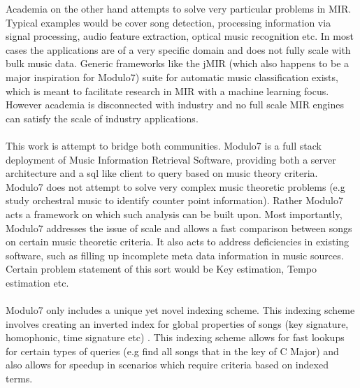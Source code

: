 Academia on the other hand attempts to solve very particular problems in MIR. Typical examples would be cover song detection, processing information via signal processing, audio feature extraction, optical music recognition etc. In most cases the applications are of a very specific domain and does not fully scale with bulk music data. Generic frameworks like the jMIR \cite{jMIR} (which also happens to be a major inspiration for Modulo7) suite for automatic music classification exists, which is meant to facilitate research in MIR with a machine learning focus. However academia is disconnected with industry and no full scale MIR engines can satisfy the scale of industry applications. \\\\
This work is attempt to bridge both communities. Modulo7 is a full stack deployment of Music Information Retrieval Software, providing both a server architecture and a sql like client to query based on music theory criteria. Modulo7 does not attempt to solve very complex music theoretic problems (e.g study orchestral music to identify counter point information). Rather Modulo7 acts a framework on which such analysis can be built upon. Most importantly, Modulo7 addresses the issue of scale and allows a fast comparison between songs on certain music theoretic criteria. It also acts to address deficiencies in existing software, such as filling up incomplete meta data information in music sources. Certain problem statement of this sort would be Key estimation, Tempo estimation etc. \\\\
Modulo7 only includes a unique yet novel indexing scheme. This indexing scheme involves creating an inverted index for global properties of songs (key signature, homophonic, time signature etc) . This indexing scheme allows for fast lookups for certain types of queries (e.g find all songs that in the key of C Major) and also allows for speedup in scenarios which require criteria based on indexed terms. 
